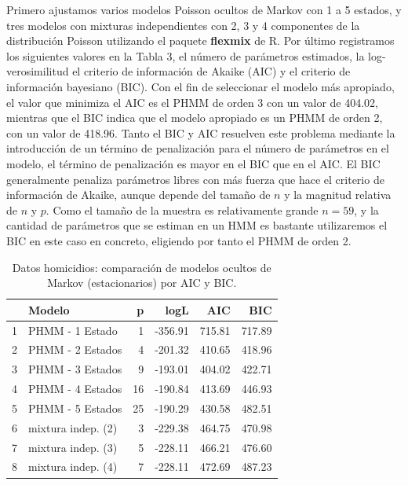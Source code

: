 \documentclass[a4paper]{article}\usepackage[]{graphicx}\usepackage[]{color}
\begin{document}
Primero ajustamos varios modelos Poisson ocultos de Markov con 1 a 5 estados, y tres modelos con mixturas independientes con 2, 3 y 4 componentes de la distribución Poisson utilizando el paquete \textbf{flexmix} de R. Por último registramos los siguientes valores en la Tabla 3, el número de parámetros estimados, la log-verosimilitud el criterio de información de Akaike (AIC) y el criterio de información bayesiano (BIC). Con el fin de seleccionar el modelo más apropiado, el valor que minimiza el AIC es el PHMM de orden 3 con un valor de 404.02, mientras que el BIC indica que el modelo apropiado es un PHMM de orden 2, con un valor de 418.96. Tanto el BIC y AIC resuelven este problema mediante la introducción de un término de penalización para el número de parámetros en el modelo, el término de penalización es mayor en el BIC que en el AIC. El BIC generalmente penaliza parámetros libres con más fuerza que hace el criterio de información de Akaike, aunque depende del tamaño de $n$ y la magnitud relativa de $n$ y $p$. Como el tamaño de la muestra es relativamente grande $n = 59$, y la cantidad de parámetros que se estiman en un HMM es bastante utilizaremos el BIC en este caso en concreto, eligiendo por tanto el PHMM de orden 2.

\begin{table}[ht]
\centering
\begin{tabular}{rlrrrr}
  \hline
 & Modelo & p & logL & AIC & BIC \\ 
  \hline
1 & PHMM - 1 Estado &   1 & -356.91 & 715.81 & 717.89 \\ 
  2 & PHMM - 2 Estados &   4 & -201.32 & 410.65 & 418.96 \\ 
  3 & PHMM - 3 Estados &   9 & -193.01 & 404.02 & 422.71 \\ 
  4 & PHMM - 4 Estados &  16 & -190.84 & 413.69 & 446.93 \\ 
  5 & PHMM - 5 Estados &  25 & -190.29 & 430.58 & 482.51 \\ 
  6 & mixtura indep. (2) &   3 & -229.38 & 464.75 & 470.98 \\ 
  7 & mixtura indep. (3) &   5 & -228.11 & 466.21 & 476.60 \\ 
  8 & mixtura indep. (4) &   7 & -228.11 & 472.69 & 487.23 \\ 
   \hline
\end{tabular}
\caption{Datos homicidios: comparación de modelos ocultos de Markov (estacionarios) por AIC y BIC.} 
\end{table}
\end{document}
